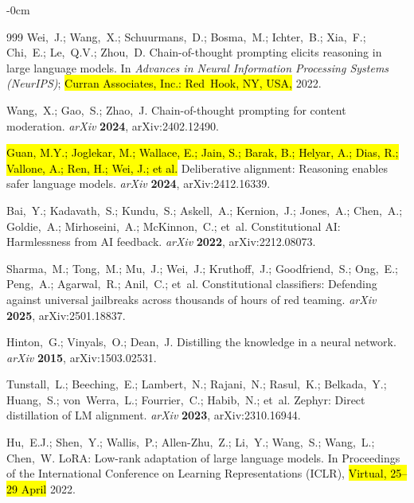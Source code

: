 \documentclass[superintelligence,article,accept,moreauthors]{Definitions/mdpi}
\begin{document}
\begin{adjustwidth}{-\extralength}{0cm}
{\begin{thebibliography}{999}
Wei,~J.; Wang,~X.; Schuurmans,~D.; Bosma,~M.; Ichter,~B.; Xia,~F.; Chi,~E.; Le,~Q.V.; Zhou,~D.
Chain-of-thought prompting elicits reasoning in large language models.
In {\em Advances in Neural Information Processing Systems (NeurIPS)}; \hl{Curran Associates, Inc.: Red~Hook, NY, USA,} 2022.

Wang,~X.; Gao,~S.; Zhao,~J.
Chain-of-thought prompting for content moderation.
{\em arXiv} {\bf 2024}, arXiv:2402.12490.

\hl{Guan, M.Y.; Joglekar, M.; Wallace, E.; Jain, S.; Barak, B.; Helyar, A.; Dias, R.; Vallone, A.; Ren, H.; Wei, J.; et al.} %
Deliberative alignment: Reasoning enables safer language models.
{\em arXiv} {\bf 2024}, arXiv:2412.16339.

Bai,~Y.; Kadavath,~S.; Kundu,~S.; Askell,~A.; Kernion,~J.; Jones,~A.; Chen,~A.; Goldie,~A.; Mirhoseini,~A.; McKinnon,~C.; et~al.
Constitutional {AI}: Harmlessness from {AI} feedback.
{\em arXiv} {\bf 2022}, arXiv:2212.08073.


Sharma,~M.; Tong,~M.; Mu,~J.; Wei,~J.; Kruthoff,~J.; Goodfriend,~S.; Ong,~E.; Peng,~A.; Agarwal,~R.; Anil,~C.; et~al.
Constitutional classifiers: Defending against universal jailbreaks across thousands of hours of red teaming.
{\em arXiv} {\bf 2025}, arXiv:2501.18837.


Hinton,~G.; Vinyals,~O.; Dean,~J.
Distilling the knowledge in a neural network.
{\em arXiv} {\bf 2015}, arXiv:1503.02531.

Tunstall,~L.; Beeching,~E.; Lambert,~N.; Rajani,~N.; Rasul,~K.; Belkada,~Y.; Huang,~S.; von~Werra,~L.; Fourrier,~C.; Habib,~N.; et~al.
Zephyr: Direct distillation of {LM} alignment.
{\em arXiv} {\bf 2023}, arXiv:2310.16944.



Hu,~E.J.; Shen,~Y.; Wallis,~P.; Allen-Zhu,~Z.; Li,~Y.; Wang,~S.; Wang,~L.; Chen,~W.
{LoRA}: Low-rank adaptation of large language models.
In {Proceedings of the International Conference on Learning Representations (ICLR)}, \hl{Virtual, 25--29 April} 2022.





\end{thebibliography}}
\end{adjustwidth}
\end{document}
